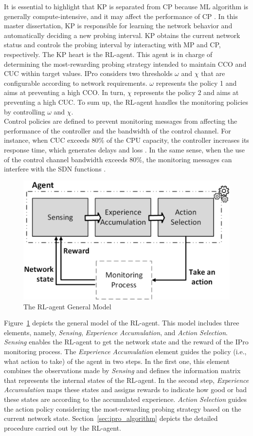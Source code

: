 It is essential to highlight that KP is separated from CP because ML algorithm is generally compute-intensive, and it may affect the performance of CP \cite{mestres_2017:KDN}. In this master dissertation, KP is responsible for learning the network behavior and automatically deciding a new probing interval. KP obtains the current network status and controls the probing interval by interacting with MP and CP, respectively. The KP heart is the RL-agent. This agent is in charge of determining the most-rewarding probing strategy intended to maintain CCO and CUC within target values. IPro considers two thresholds $\omega$ and $\chi$ that are configurable according to network requirements. $\omega$ represents the policy 1 and aims at preventing a high CCO. In turn, $\chi$ represents the policy 2 and aims at preventing a high CUC. To sum up, the RL-agent handles the monitoring policies by controlling $\omega$ and $\chi$. \\

Control policies are defined to prevent monitoring messages from affecting the performance of the controller and the bandwidth of the control channel. For instance, when CUC exceeds 80\% of the CPU capacity, the controller increases its response time, which generates delays and loss \cite{repas_2015:performance_cpu}. In the same sense, when the use of the control channel bandwidth exceeds 80\%, the monitoring messages can interfere with the SDN functions \cite{xu_2017:wildcard_requests}.\\

\begin{figure}[h!]
    \centering
    \includegraphics[width=0.50\columnwidth]{figures/Fig3-IPro-agent}
    \caption{The RL-agent General Model}
    \label{fig:ipro_agent}
\end{figure}

Figure~\ref{fig:ipro_agent} depicts the general model of the RL-agent. This model includes three elements, namely, \textit{Sensing}, \textit{Experience Accumulation}, and \textit{Action Selection}. \textit{Sensing} enables the RL-agent to get the network state and the reward of the IPro monitoring process. The \textit{Experience Accumulation} element guides the policy (i.e., what action to take) of the agent in two steps. In the first one, this element combines the observations made by \textit{Sensing} and defines the information matrix that represents the internal states of the RL-agent. In the second step, \textit{Experience Accumulation} maps these states and assigns rewards to indicate how good or bad these states are according to the accumulated experience. \textit{Action Selection} guides the action policy considering the most-rewarding probing strategy based on the current network state. Section~\ref{sec:ipro_algorithm} depicts the detailed procedure carried out by the RL-agent.

